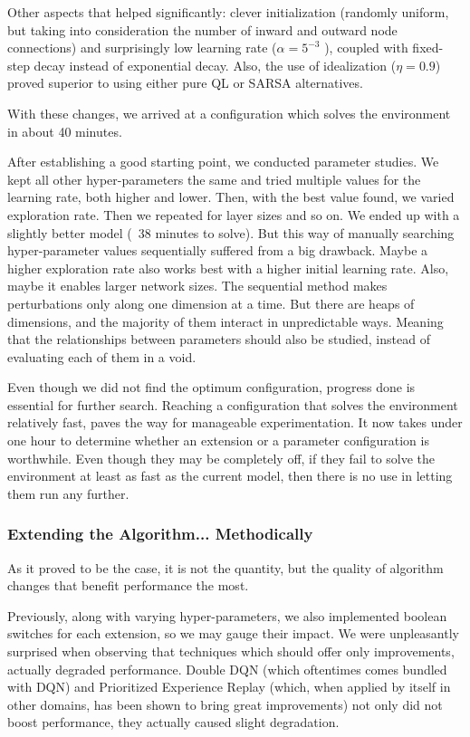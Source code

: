 \documentclass{article}
\begin{document}
 Other aspects that helped significantly: clever initialization (randomly uniform, but taking into consideration the number of inward and outward node connections) and surprisingly low learning rate ($\alpha = 5^{-3}$ ), coupled with fixed-step decay instead of exponential decay. Also, the use of idealization ($\eta = 0.9$) proved superior to using either pure QL or SARSA alternatives.
 
 With these changes, we arrived at a configuration which solves the environment in about 40 minutes.
 
 After establishing a good starting point, we conducted parameter studies. We kept all other hyper-parameters the same and tried multiple values for the learning rate, both higher and lower. Then, with the best value found, we varied exploration rate. Then we repeated for layer sizes and so on. We ended up with a slightly better model (~38 minutes to solve). But this way of manually searching hyper-parameter values sequentially suffered from a big drawback. Maybe a higher exploration rate also works best with a higher initial learning rate. Also, maybe it enables larger network sizes. The sequential method makes perturbations only along one dimension at a time. But there are heaps of dimensions, and the majority of them interact in unpredictable ways. Meaning that the relationships between parameters should also be studied, instead of evaluating each of them in a void.
 
Even though we did not find the optimum configuration, progress done is essential for further search. Reaching a configuration that solves the environment relatively fast, paves the way for manageable experimentation. It now takes under one hour to determine whether an extension or a parameter configuration is worthwhile. Even though they may be completely off, if they fail to solve the environment at least as fast as the current model, then there is no use in letting them run any further.

\subsubsection{Extending the Algorithm... Methodically}

As it proved to be the case, it is not the quantity, but the quality of algorithm changes that benefit performance the most.

Previously, along with varying hyper-parameters, we also implemented boolean switches for each extension, so we may gauge their impact. We were unpleasantly surprised when observing that techniques which should offer only improvements, actually degraded performance. Double DQN (which oftentimes comes bundled with DQN) and Prioritized Experience Replay (which, when applied by itself in other domains, has been shown to bring great improvements) not only did not boost performance, they actually caused slight degradation.
\end{document}
